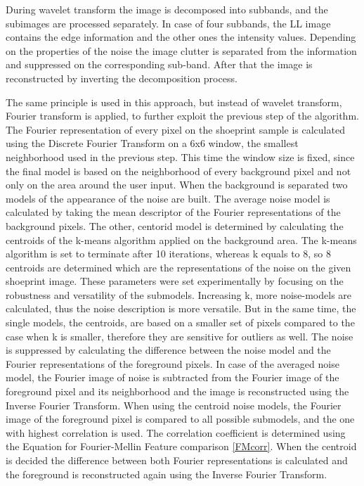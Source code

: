 \documentclass[draft,final]{vutinfth} %
\begin{document}
During wavelet transform the image is decomposed into subbands, and the subimages are processed separately.
In case of four subbands, the LL image contains the edge information and the other ones the intensity values.
Depending on the properties of the noise the image clutter is separated from the information and suppressed on the corresponding sub-band.
After that the image is reconstructed by inverting the decomposition process.
\par
The same principle is used in this approach, but instead of wavelet transform, Fourier transform is applied, to further exploit the previous step of the algorithm.
The Fourier representation of every pixel on the shoeprint sample is calculated using the Discrete Fourier Transform on a 6x6 window, the smallest neighborhood used in the previous step.
This time the window size is fixed, since the final model is based on the neighborhood of every background pixel and not only on the area around the user input.
When the background is separated two models of the appearance of the noise are built.
The average noise model is calculated by taking the mean descriptor of the Fourier representations of the background pixels. 
The other, centorid model is determined by calculating the centroids of the k-means algorithm applied on the background area.
The k-means algorithm is set to terminate after 10 iterations, whereas k equals to 8, so 8 centroids are determined which are the representations of the noise on the given shoeprint image.
These parameters were set experimentally by focusing on the robustness and versatility of the submodels.
Increasing k, more noise-models are calculated, thus the noise description is more versatile.
But in the same time, the single models, the centroids, are based on a smaller set of pixels compared to the case when k is smaller, therefore they are sensitive for outliers as well. 
The noise is suppressed by calculating the difference between the noise model and the Fourier representations of the foreground pixels.
In case of the averaged noise model, the Fourier image of noise is subtracted from the Fourier image of the foreground pixel and its neighborhood and the image is reconstructed using the Inverse Fourier Transform.
When using the centroid noise models, the Fourier image of the foreground pixel is compared to all possible submodels, and the one with highest correlation is used.
The correlation coefficient is determined using the Equation for Fourier-Mellin Feature comparison \ref{FMcorr}.
When the centroid is decided the difference between both Fourier representations is calculated and the foreground is reconstructed again using the Inverse Fourier Transform.
\end{document}
